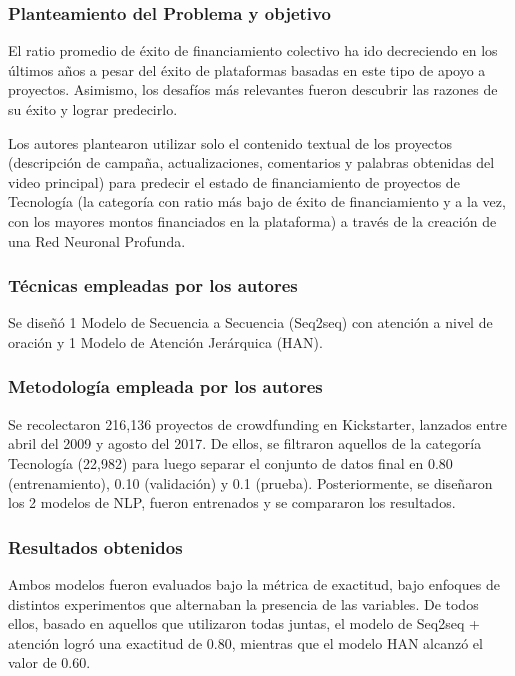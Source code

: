 \subsubsection{Planteamiento del Problema y objetivo}
El ratio promedio de éxito de financiamiento colectivo ha ido decreciendo en los últimos años a pesar del éxito de plataformas basadas en este tipo de apoyo a proyectos. Asimismo, los desafíos más relevantes fueron descubrir las razones de su éxito y lograr predecirlo.

Los autores plantearon utilizar solo el contenido textual de los proyectos (descripción de campaña, actualizaciones, comentarios y palabras obtenidas del video principal) para predecir el estado de financiamiento de proyectos de Tecnología (la categoría con ratio más bajo de éxito de financiamiento y a la vez, con los mayores montos financiados en la plataforma) a través de la creación de una Red Neuronal Profunda.

\subsubsection{Técnicas empleadas por los autores}
Se diseñó 1 Modelo de Secuencia a Secuencia (Seq2seq) con atención a nivel de oración y 1 Modelo de Atención Jerárquica (HAN).

\subsubsection{Metodología empleada por los autores}
Se recolectaron 216,136 proyectos de crowdfunding en Kickstarter, lanzados entre abril del 2009 y agosto del 2017. De ellos, se filtraron aquellos de la categoría Tecnología (22,982) para luego separar el conjunto de datos final en 0.80 (entrenamiento), 0.10 (validación) y 0.1 (prueba). Posteriormente, se diseñaron los 2 modelos de NLP, fueron entrenados y se compararon los resultados.

\subsubsection{Resultados obtenidos}
Ambos modelos fueron evaluados bajo la métrica de exactitud, bajo enfoques de distintos experimentos que alternaban la presencia de las variables. De todos ellos, basado en aquellos que utilizaron todas juntas, el modelo de Seq2seq + atención logró una exactitud de 0.80, mientras que el modelo HAN alcanzó el valor de 0.60.


